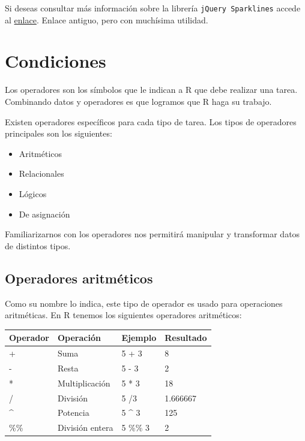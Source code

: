 \documentclass[
]{book}
\providecommand{\tightlist}{%
  \setlength{\itemsep}{0pt}\setlength{\parskip}{0pt}}
\begin{document}
Si deseas consultar más información sobre la librería \texttt{jQuery\ Sparklines} accede al \href{https://omnipotent.net/jquery.sparkline/\#s-about}{enlace}. Enlace antiguo, pero con muchísima utilidad.

\hypertarget{tse10}{%
\chapter{Condiciones}\label{tse10}}

Los operadores son los símbolos que le indican a R que debe realizar una tarea. Combinando datos y operadores es que logramos que R haga su trabajo.

Existen operadores específicos para cada tipo de tarea. Los tipos de operadores principales son los siguientes:

\begin{itemize}
\tightlist
\item
  Aritméticos
\item
  Relacionales
\item
  Lógicos
\item
  De asignación
\end{itemize}

Familiarizarnos con los operadores nos permitirá manipular y transformar datos de distintos tipos.

\hypertarget{operadores-aritmuxe9ticos}{%
\section{Operadores aritméticos}\label{operadores-aritmuxe9ticos}}

Como su nombre lo indica, este tipo de operador es usado para operaciones aritméticas. En R tenemos los siguientes operadores aritméticos:

\begin{longtable}[]{@{}llll@{}}
\toprule
Operador & Operación & Ejemplo & Resultado \\
\midrule
\endhead
+ & Suma & 5 + 3 & 8 \\
- & Resta & 5 - 3 & 2 \\
* & Multiplicación & 5 * 3 & 18 \\
/ & División & 5 /3 & 1.666667 \\
\^{} & Potencia & 5 \^{} 3 & 125 \\
\%\% & División entera & 5 \%\% 3 & 2 \\
\bottomrule
\end{longtable}
\end{document}
